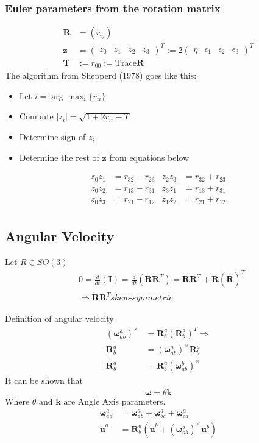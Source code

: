 \subsubsection{Euler parameters from the rotation matrix}
\begin{align*}
    \bm{R} & = (r_{ij}) \\
    \bm{z} &= \begin{pmatrix}z_0 & z_1 & z_2 & z_3 \end{pmatrix}^T := 2
        \begin{pmatrix}\eta & \epsilon_1 & \epsilon_2 & \epsilon_3\end{pmatrix}^T \\
            \bm{T} &:= r_{00} := \text{Trace} \bm{R}
\end{align*}
The algorithm from Shepperd (1978) goes like this:
\begin{itemize}
    \item Let \(i = \arg\max_i\{r_{ii}\}\)
    \item Compute \(|z_i| = \sqrt{1+2r_{ii}-T}\)
    \item Determine sign of \(z_i\)
    \item Determine the rest of \(\bm{z}\) from equations below
\end{itemize}
\begin{align*}
    z_0z_1 &= r_{32}-r_{23} & z_2z_3 &= r_{32}+r_{23} \\
    z_0z_2 &= r_{13}-r_{31} & z_3z_1 &= r_{13}+r_{31} \\
    z_0z_3 &= r_{21}-r_{12} & z_1z_2 &= r_{21}+r_{12} \\
\end{align*}

\subsection{Angular Velocity}

Let \(R\in SO(3)\)
\begin{align*}
    &0 = \frac{d}{dt}(\bm{I}) = \frac{d}{dt}(\bm{R}\bm{R}^T) = \dot{\bm{R}}\bm{R}^T + \bm{R}(\dot{\bm{R}})^T \\
    &\Rightarrow \dot{\bm{R}}\bm{R}^T \textit{skew-symmetric}
\end{align*}

Definition of angular velocity
\begin{align*}
    (\bm{\omega}_{ab}^a)^\times &= \dot{\bm{R}_b^a}(\bm{R}_b^a)^T \Rightarrow \\
    \dot{\bm{R}_b^a} &= (\bm{\omega}_{ab}^a)^\times\bm{R}_b^a \\
    \dot{\bm{R}_b^a} &= \bm{R}_b^a(\bm{\omega}_{ab}^b)^\times
\end{align*}
It can be shown that
\[\bm{\omega} = \dot{\theta}\bm{k}\]
Where \(\theta\) and \(\bm{k}\) are Angle Axis parameters.
\begin{align*}
    \bm{\omega}_{ad}^a &= \bm{\omega}_{ab}^a + \bm{\omega}_{bc}^a + \bm{\omega}_{cd}^a \\
    \dot{\bm{u}}^a &= \bm{R}_b^a(\dot{\bm{u}}^b + (\bm{\omega}_{ab}^b)^\times\bm{u}^b)
\end{align*}

